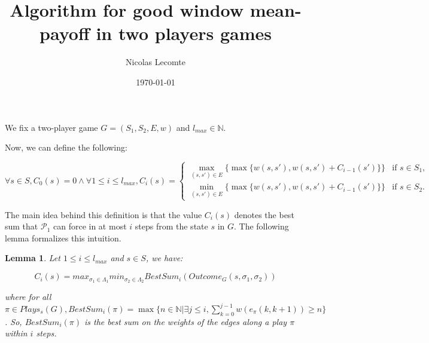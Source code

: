 \documentclass{article}
\title{Algorithm for good window mean-payoff in two players games}
\author{Nicolas Lecomte}
\date{\today}
\newcommand{\IN}{\mathbb{N}}
\theoremstyle{plain}
\newtheorem{lem}[thm]{Lemma}
\begin{document}
\maketitle

We fix a two-player game $G = (S_1, S_2, E, w)$ and $l_{max} \in \IN$.

Now, we can define the following:

\[\forall s \in S, C_0(s)=0 \wedge \forall 1 \leqslant i \leqslant l_{max}, C_i(s) =
\begin{cases}
\max_{(s, s') \in E} \{ \max \{w(s, s'), w(s, s') + C_{i-1}(s')\} \} & \text{if } s \in S_1,\\
\min_{(s, s') \in E} \{ \max \{w(s, s'), w(s, s') + C_{i-1}(s')\} \} & \text{if } s \in S_2.
\end{cases}
\]

The main idea behind this definition is that the value $C_i(s)$ denotes the best sum that $\mathcal{P}_1$ can force in at most $i$ steps from the state $s$ in $G$. The following lemma formalizes this intuition.

\begin{lem}
Let $1 \leqslant i \leqslant l_{max}$ and $s \in S$, we have:

\[ C_i(s) = max_{\sigma_1 \in \Lambda_1} min_{\sigma_2 \in \Lambda_2} BestSum_i(Outcome_G(s, \sigma_1, \sigma_2)) \]

where for all $\pi \in Plays_s(G), BestSum_i(\pi) = \max \{n \in \IN | \exists j \leqslant i, \sum_{k=0}^{j-1} w(e_\pi (k, k+1)) \geqslant n \}$. So, $BestSum_i(\pi)$ is the best sum on the weights of the edges along a play $\pi$ within $i$ steps.

\end{lem}
\end{document}
